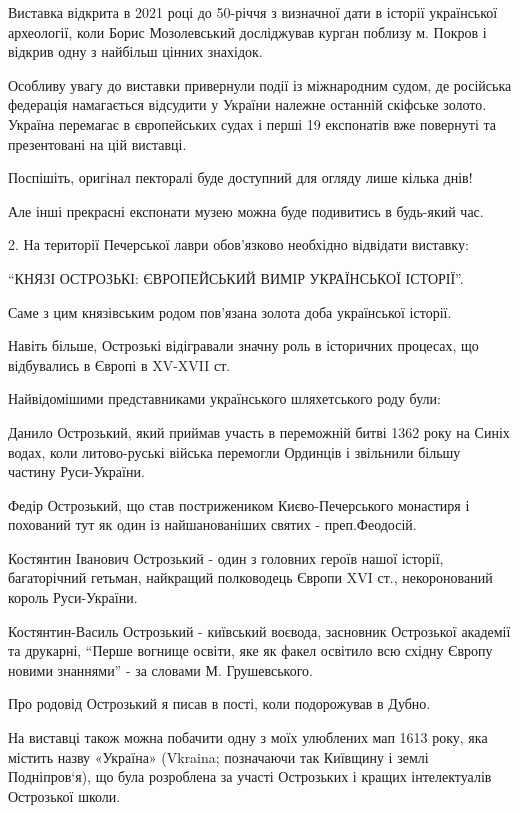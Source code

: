 Виставка відкрита в 2021 році до 50-річчя з визначної дати в історії
української археології, коли Борис Мозолевський досліджував курган поблизу
м. Покров і відкрив одну з найбільш цінних знахідок.

Особливу увагу до виставки привернули події із міжнародним судом, де російська
федерація намагається відсудити у України належне останній скіфське золото.
Україна перемагає в європейських судах і перші 19 експонатів вже повернуті та
презентовані на цій виставці.

Поспішіть, оригінал пекторалі буде доступний для огляду лише кілька днів! 

Але інші прекрасні експонати музею можна буде подивитись в будь-який час.

2. На території Печерської лаври обов’язково необхідно відвідати виставку:

\enquote{КНЯЗІ ОСТРОЗЬКІ: ЄВРОПЕЙСЬКИЙ ВИМІР УКРАЇНСЬКОЇ ІСТОРІЇ}.

Саме з цим князівським родом пов’язана золота доба української історії. 

Навіть більше, Острозькі відігравали значну роль в історичних процесах, що
відбувались в Європі в XV-XVII ст. 

Найвідомішими представниками українського шляхетського роду були:

Данило Острозький, який приймав участь в переможній битві 1362 року на Синіх
водах, коли литово-руські війська перемогли Ординців і звільнили більшу частину
Руси-України. 

Федір Острозький, що став пострижеником Києво-Печерського монастиря і похований
тут як один із найшанованіших святих - преп.Феодосій.

Костянтин Іванович Острозький - один з головних героїв нашої історії,
багаторічний гетьман, найкращий полководець Європи XVI ст., некоронований
король Руси-України.

Костянтин-Василь Острозький - київський воєвода, засновник Острозької академії
та друкарні, \enquote{Перше вогнище освіти, яке як факел освітило всю східну
Європу новими знаннями} - за словами М. Грушевського.  

Про родовід Острозький я писав в пості, коли подорожував в Дубно.

На виставці також можна побачити одну з моїх улюблених мап 1613 року, яка
містить назву «Україна» (Vkraina; позначаючи так Київщину і землі Подніпров‘я),
що була розроблена за участі Острозьких і кращих інтелектуалів Острозької
школи.

